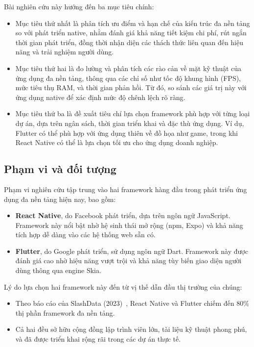     Bài nghiên cứu này hướng đến ba mục tiêu chính:
    \setlength{\leftmargini}{1.0cm}
    \begin{itemize}
        \item Mục tiêu thứ nhất là phân tích ưu điểm và hạn chế của kiến trúc đa nền tảng so với phát triển native, nhằm đánh giá khả năng tiết kiệm chi phí, rút ngắn thời gian phát triển, đồng thời nhận diện các thách thức liên quan đến hiệu năng và trải nghiệm người dùng.
        \item Mục tiêu thứ hai là đo lường và phân tích các rào cản về mặt kỹ thuật của ứng dụng đa nền tảng, thông qua các chỉ số như tốc độ khung hình (FPS), mức tiêu thụ RAM, và thời gian phản hồi. Từ đó, so sánh các giá trị này với ứng dụng native để xác định mức độ chênh lệch rõ ràng.
        \item Mục tiêu thứ ba là đề xuất tiêu chí lựa chọn framework phù hợp với từng loại dự án, dựa trên ngân sách, thời gian triển khai và đặc thù ứng dụng. Ví dụ, Flutter có thể phù hợp với ứng dụng thiên về đồ họa như game, trong khi React Native có thể là lựa chọn tối ưu cho ứng dụng doanh nghiệp.
    \end{itemize}

\subsection{Phạm vi và đối tượng}
\renewcommand{\labelitemi}{--}    

    Phạm vi nghiên cứu tập trung vào hai framework hàng đầu trong phát triển ứng dụng đa nền tảng hiện nay, bao gồm:
    \setlength{\leftmargini}{1.0cm}
    \begin{itemize}
        \item \textbf{React Native}, do Facebook phát triển, dựa trên ngôn ngữ JavaScript. Framework này nổi bật nhờ hệ sinh thái mở rộng (npm, Expo) và khả năng tích hợp dễ dàng vào các hệ thống web sẵn có.
        \item \textbf{Flutter}, do Google phát triển, sử dụng ngôn ngữ Dart. Framework này được đánh giá cao nhờ hiệu năng vượt trội và khả năng tùy biến giao diện người dùng thông qua engine Skia.
    \end{itemize}
\vspace{0.5em}


    Lý do lựa chọn hai framework này đến từ vị thế dẫn đầu thị trường của chúng:
    \setlength{\leftmargini}{1.0cm}
    \begin{itemize}
        \item Theo báo cáo của SlashData (2023)~\cite{slashdata2023}, React Native và Flutter chiếm đến 80\% thị phần framework đa nền tảng.
        \item Cả hai đều sở hữu cộng đồng lập trình viên lớn, tài liệu kỹ thuật phong phú, và đã được triển khai rộng rãi trong các dự án thực tế.
    \end{itemize}
\vspace{0.5em}


